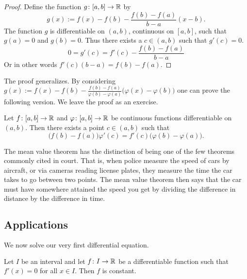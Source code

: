 \begin{proof}
Define the
function $g \colon [a,b] \to {\mathbb{R}}$ by
\begin{equation*}
g(x) := f(x)-f(b)-\frac{f(b)-f(a)}{b-a}(x-b) .
\end{equation*}
The function $g$ is differentiable on $(a,b)$,
continuous on $[a,b]$, such that $g(a) = 0$ and $g(b) = 0$.  Thus there exists
a
$c \in (a,b)$ such that $g'(c) = 0$.
\begin{equation*}
0 = g'(c) = f'(c)-\frac{f(b)-f(a)}{b-a}
\end{equation*}
Or in other words
$f'(c)(b-a) = f(b)-f(a)$.
\end{proof}

The proof generalizes.  By considering
$g(x) :=
f(x)-f(b)-\frac{f(b)-f(a)}{\varphi(b)-\varphi(a)}\bigl(\varphi(x)-\varphi(b)\bigr)$
one can prove the following version.  We leave the proof as an exercise.

\begin{thm} \label{thm:cauchymvt}
Let $f \colon [a,b] \to {\mathbb{R}}$ and $\varphi \colon [a,b] \to {\mathbb{R}}$ be continuous
functions
differentiable on $(a,b)$.  Then there exists a point $c \in (a,b)$
such that
\begin{equation*}
\bigl(f(b)-f(a)\bigr)\varphi'(c) = f'(c)\bigl(\varphi(b)-\varphi(a)\bigr) .
\end{equation*}
\end{thm}

The mean value theorem has the distinction of being one of the few theorems
commonly cited
in court.  That is, when police measure the speed of cars by aircraft, or
via cameras reading license plates, they 
measure the time the car takes to go between two points.
The mean value theorem then
says that the car must have somewhere attained the speed you get by dividing the
difference in distance by the difference in time.



\subsection{Applications}

We now solve our very first differential equation.

\begin{prop} \label{prop:derzeroconst}
Let $I$ be an interval and
let $f \colon I \to {\mathbb{R}}$ be a differentiable function such that $f'(x) = 0$
for all $x \in I$.
Then $f$ is constant.
\end{prop}

